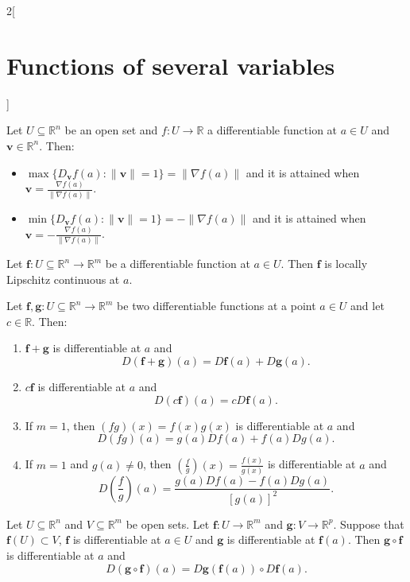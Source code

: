 \documentclass[class=article,10pt,crop=false]{standalone}
\begin{document}
\begin{multicols}{2}[\section{Functions of several variables}]
\begin{prop}
\end{prop}
\begin{prop}
Let $U\subseteq\mathbb{R}^n$ be an open set and $f:U\rightarrow\mathbb{R}$ a differentiable function at $a\in U$ and $\textbf{v}\in\mathbb{R}^n$. Then:
\begin{itemize}
    \item $\displaystyle\max\{D_\textbf{v}f(a):\|\textbf{v}\|=1\}=\|\nabla f(a)\|$ and it is attained when $\displaystyle \textbf{v}=\frac{\nabla f(a)}{\|\nabla f(a)\|}$.
    \item $\displaystyle\min\{D_\textbf{v}f(a):\|\textbf{v}\|=1\}=-\|\nabla f(a)\|$ and it is attained when $\displaystyle \textbf{v}=-\frac{\nabla f(a)}{\|\nabla f(a)\|}$.
\end{itemize}
\end{prop}
\begin{theorem}
Let $\boldsymbol{f}:U\subseteq\mathbb{R}^n\rightarrow\mathbb{R}^m$ be a differentiable function at $a\in U$. Then $\boldsymbol{f}$ is locally Lipschitz continuous at $a$.
\end{theorem}
\begin{theorem} 
Let $\boldsymbol{f},\boldsymbol{g}:U\subseteq\mathbb{R}^n\to\mathbb{R}^m$ be two differentiable functions at a point $a\in U$ and let $c\in\mathbb{R}$. Then:
\begin{enumerate}
    \item $\boldsymbol{f}+\boldsymbol{g}$ is differentiable at $a$ and $$D(\boldsymbol{f}+\boldsymbol{g})(a)=D\boldsymbol{f}(a)+D\boldsymbol{g}(a).$$
    \item $c\boldsymbol{f}$ is differentiable at $a$ and
    $$D(c\boldsymbol{f})(a)=cD\boldsymbol{f}(a).$$
    \item If $m=1$, then $(fg)(x)=f(x)g(x)$ is differentiable at $a$ and $$D(fg)(a)=g(a)Df(a)+f(a)Dg(a).$$
    \item If $m=1$ and $g(a)\ne0$, then $\displaystyle\left(\frac{f}{g}\right)(x)=\frac{f(x)}{g(x)}$ is differentiable at $a$ and $$D\left(\frac{f}{g}\right)(a)=\frac{g(a)Df(a)-f(a)Dg(a)}{[g(a)]^2}.$$
\end{enumerate}
\end{theorem}
\begin{theorem}
Let $U\subseteq\mathbb{R}^n$ and $V\subseteq\mathbb{R}^m$ be open sets. Let $\boldsymbol{f}:U\rightarrow\mathbb{R}^m$ and $\boldsymbol{g}:V\rightarrow\mathbb{R}^p$. Suppose that $\boldsymbol{f}(U)\subset V$, $\boldsymbol{f}$ is differentiable at $a\in U$ and $\boldsymbol{g}$ is differentiable at $\boldsymbol{f}(a)$. Then $\boldsymbol{g}\circ \boldsymbol{f}$ is differentiable at $a$ and $$D(\boldsymbol{g}\circ \boldsymbol{f})(a)=D\boldsymbol{g}(\boldsymbol{f}(a))\circ D\boldsymbol{f}(a).$$

\end{theorem}
\end{multicols}
\end{document}
